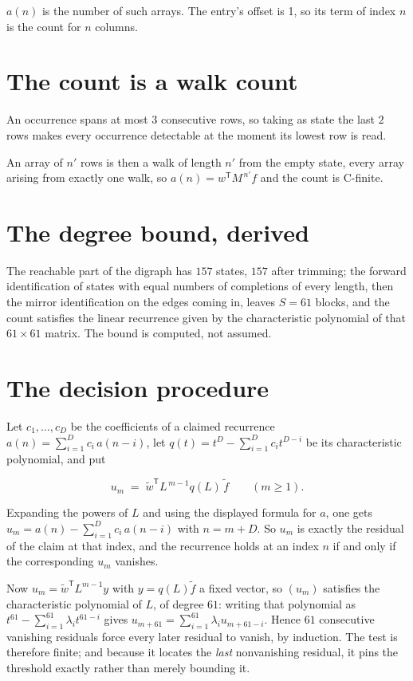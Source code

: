 \documentclass[11pt]{article}
\theoremstyle{definition}
\begin{document}
$a(n)$ is the number of such arrays. The entry's offset is 1, so its term of index $n$ is the count for $n$ columns.

\section{The count is a walk count}

An occurrence spans at most $3$ consecutive rows, so taking as state the last $2$ rows makes every occurrence detectable at the moment its lowest row is read.

An array of $n'$ rows is then a walk of length $n'$ from the empty state, every array arising from exactly one walk, so $a(n) = w^{\mathsf T}M^{\,n'}f$ and the count is C-finite.

\section{The degree bound, derived}

The reachable part of the digraph has $157$ states, $157$ after trimming; the forward identification of states with equal numbers of completions of every length, then the mirror identification on the edges coming in, leaves $S = 61$ blocks, and the count satisfies the linear recurrence given by the characteristic polynomial of that $61\times61$ matrix. The bound is computed, not assumed.

\section{The decision procedure}

Let $c_1,\dots,c_D$ be the coefficients of a claimed recurrence $a(n) = \sum_{i=1}^{D} c_i\,a(n-i)$, let $q(t) = t^{D} - \sum_{i=1}^{D} c_i t^{D-i}$ be its characteristic polynomial, and put

\[u_m \;=\; \tilde w^{\mathsf T} L^{\,m-1} q(L)\,\tilde f \qquad (m \ge 1).\]

Expanding the powers of $L$ and using the displayed formula for $a$, one gets $u_m = a(n) - \sum_{i=1}^{D} c_i\,a(n-i)$ with $n = m + D$. So $u_m$ is exactly the residual of the claim at that index, and the recurrence holds at an index $n$ if and only if the corresponding $u_m$ vanishes.

Now $u_m = \tilde w^{\mathsf T} L^{m-1} y$ with $y = q(L)\tilde f$ a fixed vector, so $(u_m)$ satisfies the characteristic polynomial of $L$, of degree $61$: writing that polynomial as $t^{61} - \sum_{i=1}^{61} \lambda_i t^{61-i}$ gives $u_{m+61} = \sum_{i=1}^{61} \lambda_i u_{m+61-i}$. Hence $61$ consecutive vanishing residuals force every later residual to vanish, by induction. The test is therefore finite; and because it locates the {\itshape last} nonvanishing residual, it pins the threshold exactly rather than merely bounding it.
\end{document}
